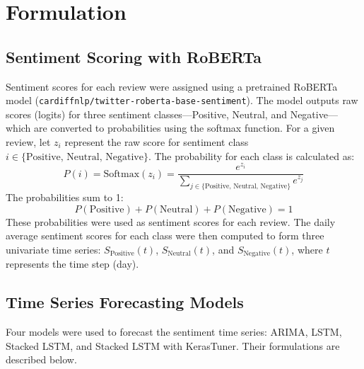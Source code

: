 \documentclass[letterpaper]{article}
\begin{document}
\section{Formulation}

\subsection{Sentiment Scoring with RoBERTa}
Sentiment scores for each review were assigned using a pretrained RoBERTa model (\texttt{cardiffnlp/twitter-roberta-base-sentiment}). The model outputs raw scores (logits) for three sentiment classes—Positive, Neutral, and Negative—which are converted to probabilities using the softmax function. For a given review, let $z_i$ represent the raw score for sentiment class $i \in \{\text{Positive, Neutral, Negative}\}$. The probability for each class is calculated as:
\[
P(i) = \text{Softmax}(z_i) = \frac{e^{z_i}}{\sum_{j \in \{\text{Positive, Neutral, Negative}\}} e^{z_j}}
\]
The probabilities sum to 1:
\[
P(\text{Positive}) + P(\text{Neutral}) + P(\text{Negative}) = 1
\]
These probabilities were used as sentiment scores for each review. The daily average sentiment scores for each class were then computed to form three univariate time series: $S_{\text{Positive}}(t)$, $S_{\text{Neutral}}(t)$, and $S_{\text{Negative}}(t)$, where $t$ represents the time step (day).

\subsection{Time Series Forecasting Models}
Four models were used to forecast the sentiment time series: ARIMA, LSTM, Stacked LSTM, and Stacked LSTM with KerasTuner. Their formulations are described below.\\
\end{document}
